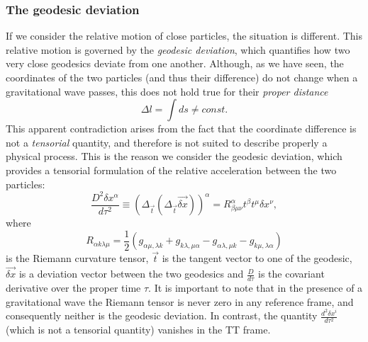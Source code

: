 \subsubsection{The geodesic deviation}
If we consider the relative motion of close particles, the situation is different.
This relative motion is governed by the \textit{geodesic deviation}, which quantifies how two very close geodesics deviate from one another.
Although, as we have seen, the coordinates of the two particles (and thus their difference) do not change when a gravitational wave passes, this does not hold true for their \textit{proper distance}
\[
    \Delta l = \int ds \not = const.
\]
This apparent contradiction arises from the fact that the coordinate difference is not a \textit{tensorial} quantity, and therefore is not suited to describe properly a physical process.
This is the reason we consider the geodesic deviation, which provides a tensorial formulation of the relative acceleration between the two particles: 
\begin{equation}
    \frac{D^2\delta x^\alpha}{d\tau^2} \equiv (\Delta_{\vec{t}}(\Delta_{\vec{t}}\vec{\delta x}))^\alpha = R^\alpha_{\beta\mu\nu}t^\beta t^\mu \delta x^\nu,
    \label{eq: geodesic deviation}
\end{equation}
where 
\begin{equation}
    R_{\alpha k \lambda \mu} = \frac{1}{2}( g_{\alpha\mu,\lambda k}  + g_{k\lambda,\mu \alpha }  - g_{\alpha\lambda,\mu k }  - g_{k\mu,\lambda \alpha })
    \label{eq: Riemann tensor def}
\end{equation}
is the Riemann curvature tensor, $\vec{t}$ is the tangent vector to one of the geodesic, $\vec{\delta x}$ is a deviation vector between the two geodesics and $\frac{D}{d\tau}$ is the covariant derivative over the proper time $\tau$.
It is important to note that in the presence of a gravitational wave the Riemann tensor is never zero in any reference frame, and consequently neither is the geodesic deviation. 
In contrast, the quantity $\frac{d^2\delta x^i}{d\tau^2}$ (which is not a tensorial quantity) vanishes in the TT frame.

